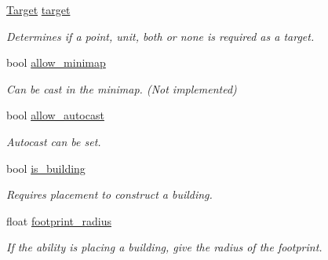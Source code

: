 \begin{DoxyCompactItemize}
\hyperlink{structsc2_1_1_ability_data_a15aaa20bd058eeb35728e2eeff6518f6}{Target} \hyperlink{structsc2_1_1_ability_data_a2351270150739e40d945e21fb801bedf}{target}
\begin{DoxyCompactList}\small\item\em Determines if a point, unit, both or none is required as a target. \end{DoxyCompactList}\item 
\mbox{\label{structsc2_1_1_ability_data_aa3cb5f43be280f584aa8246ee15f2f64}} 
bool \hyperlink{structsc2_1_1_ability_data_aa3cb5f43be280f584aa8246ee15f2f64}{allow\+\_\+minimap}
\begin{DoxyCompactList}\small\item\em Can be cast in the minimap. (Not implemented) \end{DoxyCompactList}\item 
\mbox{\label{structsc2_1_1_ability_data_af80a0130a5c15ade16adeb9c415b89c0}} 
bool \hyperlink{structsc2_1_1_ability_data_af80a0130a5c15ade16adeb9c415b89c0}{allow\+\_\+autocast}
\begin{DoxyCompactList}\small\item\em Autocast can be set. \end{DoxyCompactList}\item 
\mbox{\label{structsc2_1_1_ability_data_a252839497c027c2278ca126405d53da9}} 
bool \hyperlink{structsc2_1_1_ability_data_a252839497c027c2278ca126405d53da9}{is\+\_\+building}
\begin{DoxyCompactList}\small\item\em Requires placement to construct a building. \end{DoxyCompactList}\item 
\mbox{\label{structsc2_1_1_ability_data_a600be2fc1d258608994d9658f6488c8c}} 
float \hyperlink{structsc2_1_1_ability_data_a600be2fc1d258608994d9658f6488c8c}{footprint\+\_\+radius}
\begin{DoxyCompactList}\small\item\em If the ability is placing a building, give the radius of the footprint. \end{DoxyCompactList}\item 
\mbox{\label{structsc2_1_1_ability_data_a9fe8873ca4353862d1e2425526628ec1}} 

\end{DoxyCompactItemize}
